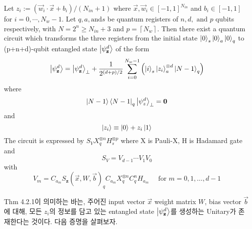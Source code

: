 \begin{theorem}
    Let \(z_i := \left( \vec{w}_i \cdot \vec{x} + b_i \right) / \left( N_{in} + 1 \right)\) where \(\vec{x}, \vec{w}_i \in [-1, 1]^{N_{in}}\) and \(b_i \in [-1, 1]\) for \(i = 0, \cdots, N_w - 1\). Let $q, a, \text{and} s$ be quantum registers of $n, d, \text{ and } p$ qubits respectively, with \( N = 2^n \ge N_{in} + 3 \) and \( p = \left\lceil N_{w} \right\rceil\). Then there exist a quantum circuit which transforms the three registers from the initial state \(\ket{0}_s \ket{0}_a \ket{0}_q\) to (p+n+d)-qubit entangled state \(\ket{\psi_{\mathbf z}^d}\) of the form 
    \[
        \ket{\psi_{\mathbf z}^d} = \ket{\psi_{\mathbf z}^d}_{\perp} + {1 \over {2^{(d + p) / 2}}}\sum_{i=0}^{N_w - 1}\left( \ket{i}_{s} \ket{z_i}_{a}^{\otimes d} \ket{N-1}_q \right)
    \]
    where
    \[
        \ket{N-1}\bra{N-1}_q \ket{\psi_z^d}_{\perp} = \mathbf{0}
    \]
    and
    \[
        \ket{z_i} \equiv \ket{0} + z_i\ket{1}
    \]  
    The circuit is expressed by $S_V X_q^{\otimes n} H_s^{\otimes p}$ where X is Pauli-X, H is Hadamard gate and 
    \[
        S_V = V_{d-1} \cdots V_1 V_0
    \]
    with
    \[
        V_m = C_{a_m}S_{\mathbf{z}}(\vec{x}, W, \vec{b})_q C_{a_m}X^{\otimes n}_q C_q^nH_{a_m} \quad \text{ for } m = 0, 1, \dots, d - 1
    \]  
\end{theorem}

Thm 4.2.1이 의미하는 바는, 주어진 input vector \(\vec x\) weight matrix \(W\), bias vector \(\vec b\)에 대해, 모든 \(z_i\)의 정보를 담고 있는 entangled state $\ket{\psi_{\mathbf z}^d}$를 생성하는 Unitary가 존재한다는 것이다. 다음 증명을 살펴보자.

